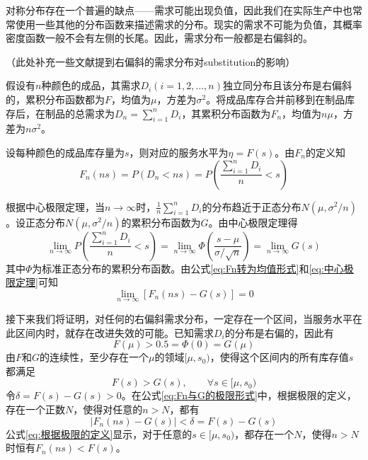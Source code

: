 对称分布存在一个普遍的缺点——需求可能出现负值，因此我们在实际生产中也常常使用一些其他的分布函数来描述需求的分布。现实的需求不可能为负值，其概率密度函数一般不会有左侧的长尾。因此，需求分布一般都是右偏斜的。

（此处补充一些文献提到右偏斜的需求分布对substitution的影响）

假设有$n$种颜色的成品，其需求$D_i(i=1,2,\ldots,n)$独立同分布且该分布是右偏斜的，累积分布函数都为$F$，均值为$\mu$，方差为$\sigma^2$。将成品库存合并前移到在制品库存后，在制品的总需求为$D_n=\sum_{i=1}^nD_i$，其累积分布函数为$F_n$，均值为$n\mu$，方差为$n\sigma^2$。

设每种颜色的成品库存量为$s$，则对应的服务水平为$\eta=F(s)$。由$F_n$的定义知
\begin{equation}
F_n(ns) = P(D_n<ns) = P\left(\frac{\sum_{i=1}^nD_i}{n}<s\right)
\label{eq:Fn转为均值形式}
\end{equation}

根据中心极限定理，当$n\to\infty$时，$\frac{1}{n}\sum_{i=1}^nD_i$的分布趋近于正态分布$N(\mu,\sigma^2/n)$。设正态分布$N(\mu,\sigma^2/n)$的累积分布函数为$G$。由中心极限定理得
\begin{equation}
\lim_{n\to\infty}P\left(\frac{\sum_{i=1}^nD_i}{n}<s\right) = \lim_{n\to\infty}\Phi\left(\frac{s-\mu}{\sigma/\sqrt{n}}\right) = \lim_{n\to\infty}G(s)
\label{eq:中心极限定理}
\end{equation}
其中$\Phi$为标准正态分布的累积分布函数。由公式\ref{eq:Fn转为均值形式}和\ref{eq:中心极限定理}可知
\begin{equation}
\lim_{n\to\infty}[F_n(ns)-G(s)]=0
\label{eq:Fn与G的极限形式}
\end{equation}

接下来我们将证明，对任何的右偏斜需求分布，一定存在一个区间，当服务水平在此区间内时，就存在改进失效的可能。已知需求$D_i$的分布是右偏的，因此有
\begin{equation}
F(\mu) > 0.5 = \Phi(0) = G(\mu)
\label{eq:右偏斜的性质}
\end{equation}
由$F$和$G$的连续性，至少存在一个$\mu$的领域$[\mu,s_0)$，使得这个区间内的所有库存值$s$都满足
\[
F(s) > G(s),\qquad \forall s\in[\mu,s_0)
\]
令$\delta=F(s)-G(s)>0$。在公式\ref{eq:Fn与G的极限形式}中，根据极限的定义，存在一个正数$N$，使得对任意的$n>N$，都有
\begin{equation}
|F_n(ns)-G(s)| < \delta = F(s) - G(s)
\label{eq:根据极限的定义}
\end{equation}
公式\ref{eq:根据极限的定义}显示，对于任意的$s\in[\mu,s_0)$，都存在一个$N$，使得$n>N$时恒有$F_n(ns)<F(s)$。


